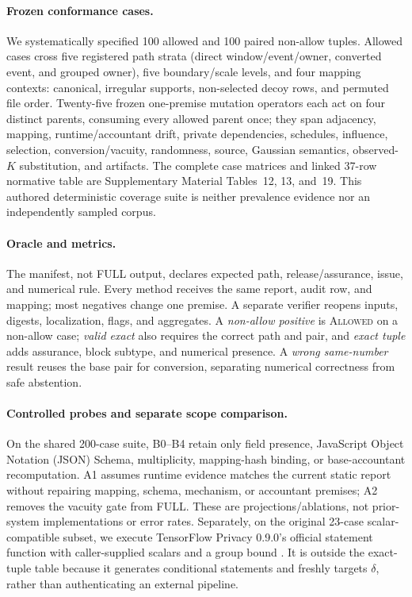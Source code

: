 \documentclass[letterpaper]{article} %
\newcommand{\Allowed}{\textsc{Allowed}}
\begin{document}
\paragraph{Frozen conformance cases.}
We systematically specified 100 allowed and 100 paired non-allow tuples. Allowed cases cross five registered path strata (direct window/event/owner, converted event, and grouped owner), five boundary/scale levels, and four mapping contexts: canonical, irregular supports, non-selected decoy rows, and permuted file order. Twenty-five frozen one-premise mutation operators each act on four distinct parents, consuming every allowed parent once; they span adjacency, mapping, runtime/accountant drift, private dependencies, schedules, influence, selection, conversion/vacuity, randomness, source, Gaussian semantics, observed-$K$ substitution, and artifacts. The complete case matrices and linked 37-row normative table are Supplementary Material Tables~12, 13, and~19. This authored deterministic coverage suite is neither prevalence evidence nor an independently sampled corpus.

\paragraph{Oracle and metrics.}
The manifest, not FULL output, declares expected path, release/assurance, issue, and numerical rule. Every method receives the same report, audit row, and mapping; most negatives change one premise. A separate verifier reopens inputs, digests, localization, flags, and aggregates. A \emph{non-allow positive} is \Allowed{} on a non-allow case; \emph{valid exact} also requires the correct path and pair, and \emph{exact tuple} adds assurance, block subtype, and numerical presence. A \emph{wrong same-number} result reuses the base pair for conversion, separating numerical correctness from safe abstention.

\paragraph{Controlled probes and separate scope comparison.}
On the shared 200-case suite, B0--B4 retain only field presence, JavaScript Object Notation (JSON) Schema, multiplicity, mapping-hash binding, or base-accountant recomputation. A1 assumes runtime evidence matches the current static report without repairing mapping, schema, mechanism, or accountant premises; A2 removes the vacuity gate from FULL. These are projections/ablations, not prior-system implementations or error rates. Separately, on the original 23-case scalar-compatible subset, we execute TensorFlow Privacy 0.9.0's official statement function with caller-supplied scalars and a group bound \citep{tensorflowprivacystatement}. It is outside the exact-tuple table because it generates conditional statements and freshly targets $\delta$, rather than authenticating an external pipeline.
\end{document}
